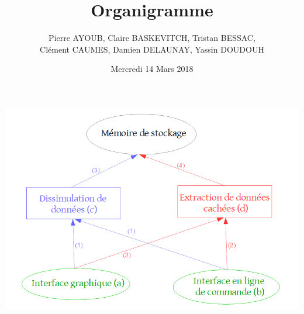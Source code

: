 \documentclass[11pt]{article}
\title{Organigramme}
\author{Pierre AYOUB, Claire BASKEVITCH, Tristan BESSAC, \\
Clément CAUMES, Damien DELAUNAY, Yassin DOUDOUH}
\date{Mercredi 14 Mars 2018}
\begin{document}
\hspace{1cm}
\includegraphics[scale=0.70]{organigramme.png}
\end{document}
